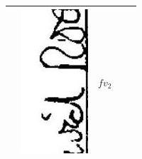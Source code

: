 \documentclass[10pt]{article}
\begin{document}
\begin{center}
\begin{tabular}{|c|c|c|c|c|}
 & \includegraphics[max width=\textwidth]{2025_02_27_dd68c3d38de88f0516d9g-062}
 & \( f v_{2} \) &  \\
\hline
\end{tabular}
\end{center}
\end{document}
